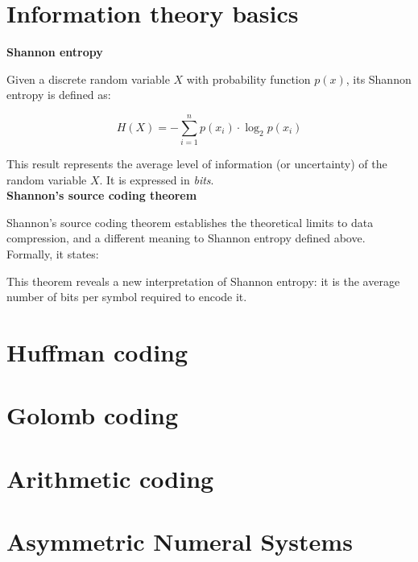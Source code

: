 \section{Information theory basics}
\large\textbf{Shannon entropy}

Given a discrete random variable $X$ with probability function $p(x)$, its Shannon entropy is defined as:

\begin{equation}
H(X) = - \sum_{i=1}^{n} p(x_i) \cdot \log_2 p(x_i) 
\end{equation}

This result represents the average level of information (or uncertainty) of the random variable $X$. It is expressed in \textit{bits}.\\


\large\textbf{Shannon's source coding theorem}

Shannon's source coding theorem establishes the theoretical limits to data compression, and a different meaning to Shannon entropy defined above. Formally, it states:

This theorem reveals a new interpretation of Shannon entropy: it is the average number of bits per symbol required to encode it.

\section{Huffman coding}

\section{Golomb coding}

\section{Arithmetic coding}

\section{Asymmetric Numeral Systems}

